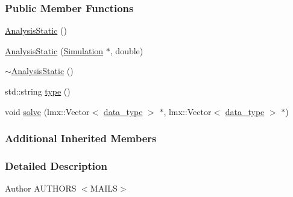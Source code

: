\subsubsection*{Public Member Functions}
\begin{DoxyCompactItemize}
\item 
\hyperlink{classmknix_1_1_analysis_static_ac64781280792830016fe43f344966f99}{Analysis\-Static} ()
\item 
\hyperlink{classmknix_1_1_analysis_static_a18cfe64c3b4b6b3f54acc3caa6780e92}{Analysis\-Static} (\hyperlink{classmknix_1_1_simulation}{Simulation} $\ast$, double)
\item 
\hyperlink{classmknix_1_1_analysis_static_a67877fe7b967f91b1b8c92cf4afe1658}{$\sim$\-Analysis\-Static} ()
\item 
std\-::string \hyperlink{classmknix_1_1_analysis_static_a14ab31bf7d144b576cbc7ea8de0d4fd9}{type} ()
\item 
void \hyperlink{classmknix_1_1_analysis_static_a1f2d048b8625d58f820a7f7d8dfe2f7d}{solve} (lmx\-::\-Vector$<$ \hyperlink{namespacemknix_a16be4b246fbf2cceb141e3a179111020}{data\-\_\-type} $>$ $\ast$, lmx\-::\-Vector$<$ \hyperlink{namespacemknix_a16be4b246fbf2cceb141e3a179111020}{data\-\_\-type} $>$ $\ast$)
\end{DoxyCompactItemize}
\subsubsection*{Additional Inherited Members}


\subsubsection{Detailed Description}
\begin{DoxyAuthor}{Author}
A\-U\-T\-H\-O\-R\-S $<$\-M\-A\-I\-L\-S$>$ 
\end{DoxyAuthor}



